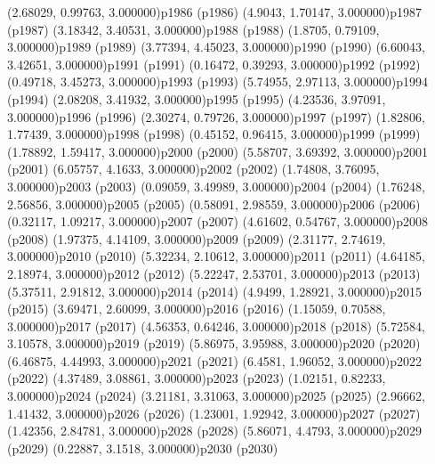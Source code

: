 \psPoint(2.68029, 0.99763, 3.000000){p1986}
\psdot(p1986)
\psPoint(4.9043, 1.70147, 3.000000){p1987}
\psdot(p1987)
\psPoint(3.18342, 3.40531, 3.000000){p1988}
\psdot(p1988)
\psPoint(1.8705, 0.79109, 3.000000){p1989}
\psdot(p1989)
\psPoint(3.77394, 4.45023, 3.000000){p1990}
\psdot(p1990)
\psPoint(6.60043, 3.42651, 3.000000){p1991}
\psdot(p1991)
\psPoint(0.16472, 0.39293, 3.000000){p1992}
\psdot(p1992)
\psPoint(0.49718, 3.45273, 3.000000){p1993}
\psdot(p1993)
\psPoint(5.74955, 2.97113, 3.000000){p1994}
\psdot(p1994)
\psPoint(2.08208, 3.41932, 3.000000){p1995}
\psdot(p1995)
\psPoint(4.23536, 3.97091, 3.000000){p1996}
\psdot(p1996)
\psPoint(2.30274, 0.79726, 3.000000){p1997}
\psdot(p1997)
\psPoint(1.82806, 1.77439, 3.000000){p1998}
\psdot(p1998)
\psPoint(0.45152, 0.96415, 3.000000){p1999}
\psdot(p1999)
\psPoint(1.78892, 1.59417, 3.000000){p2000}
\psdot(p2000)
\psPoint(5.58707, 3.69392, 3.000000){p2001}
\psdot(p2001)
\psPoint(6.05757, 4.1633, 3.000000){p2002}
\psdot(p2002)
\psPoint(1.74808, 3.76095, 3.000000){p2003}
\psdot(p2003)
\psPoint(0.09059, 3.49989, 3.000000){p2004}
\psdot(p2004)
\psPoint(1.76248, 2.56856, 3.000000){p2005}
\psdot(p2005)
\psPoint(0.58091, 2.98559, 3.000000){p2006}
\psdot(p2006)
\psPoint(0.32117, 1.09217, 3.000000){p2007}
\psdot(p2007)
\psPoint(4.61602, 0.54767, 3.000000){p2008}
\psdot(p2008)
\psPoint(1.97375, 4.14109, 3.000000){p2009}
\psdot(p2009)
\psPoint(2.31177, 2.74619, 3.000000){p2010}
\psdot(p2010)
\psPoint(5.32234, 2.10612, 3.000000){p2011}
\psdot(p2011)
\psPoint(4.64185, 2.18974, 3.000000){p2012}
\psdot(p2012)
\psPoint(5.22247, 2.53701, 3.000000){p2013}
\psdot(p2013)
\psPoint(5.37511, 2.91812, 3.000000){p2014}
\psdot(p2014)
\psPoint(4.9499, 1.28921, 3.000000){p2015}
\psdot(p2015)
\psPoint(3.69471, 2.60099, 3.000000){p2016}
\psdot(p2016)
\psPoint(1.15059, 0.70588, 3.000000){p2017}
\psdot(p2017)
\psPoint(4.56353, 0.64246, 3.000000){p2018}
\psdot(p2018)
\psPoint(5.72584, 3.10578, 3.000000){p2019}
\psdot(p2019)
\psPoint(5.86975, 3.95988, 3.000000){p2020}
\psdot(p2020)
\psPoint(6.46875, 4.44993, 3.000000){p2021}
\psdot(p2021)
\psPoint(6.4581, 1.96052, 3.000000){p2022}
\psdot(p2022)
\psPoint(4.37489, 3.08861, 3.000000){p2023}
\psdot(p2023)
\psPoint(1.02151, 0.82233, 3.000000){p2024}
\psdot(p2024)
\psPoint(3.21181, 3.31063, 3.000000){p2025}
\psdot(p2025)
\psPoint(2.96662, 1.41432, 3.000000){p2026}
\psdot(p2026)
\psPoint(1.23001, 1.92942, 3.000000){p2027}
\psdot(p2027)
\psPoint(1.42356, 2.84781, 3.000000){p2028}
\psdot(p2028)
\psPoint(5.86071, 4.4793, 3.000000){p2029}
\psdot(p2029)
\psPoint(0.22887, 3.1518, 3.000000){p2030}
\psdot(p2030)
